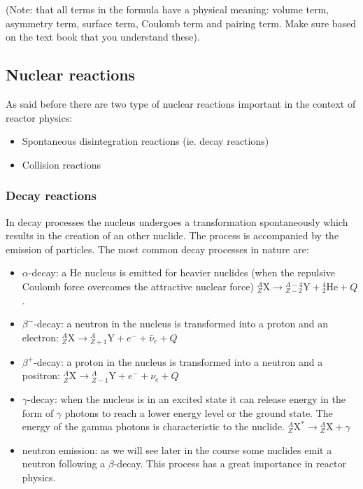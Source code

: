 (Note: that all terms in the formula have a physical meaning: volume term, asymmetry term, surface term, Coulomb term and pairing term. Make sure based on the text book that you understand these).


\subsection{Nuclear reactions}

As said before there are two type of nuclear reactions important in the context of reactor physics:

\begin{itemize}
\item Spontaneous disintegration reactions (ie. decay reactions)
\item Collision reactions
\end{itemize}

\subsubsection{Decay reactions}

In decay processes the nucleus undergoes a transformation spontaneously  which results in the creation of an other nuclide. The process is accompanied by the emission of particles. The most common decay processes in nature are:

\begin{itemize}
\item $\alpha$-decay: a He nucleus is emitted for heavier nuclides (when the repulsive Coulomb force overcomes the attractive nuclear force)  ${}_Z^A\text{X} \rightarrow {}_{Z-2}^{A-4}\text{Y} + {}_2^4\text{He} + Q$.
\item $\beta^-$-decay: a neutron in the nucleus is transformed into a proton and an electron: ${}_Z^A\text{X} \rightarrow {}_{Z+1}^{A}\text{Y} + e^-+\bar\nu_e + Q$
\item $\beta^+$-decay: a proton in the nucleus is transformed into a neutron and a positron: ${}_Z^A\text{X} \rightarrow {}_{Z-1}^{A}\text{Y} + e^-+\nu_e + Q$
\item $\gamma$-decay: when the nucleus is in an excited state it can release energy in the form of $\gamma$ photons to reach a lower energy level or the ground state. The energy of the gamma photons is characteristic to the nuclide. ${}_Z^A\text{X}^*\rightarrow {}_Z^A\text{X} + \gamma$
\item neutron emission: as we will see later in the course some nuclides emit a neutron following a $\beta$-decay. This process has a great importance in reactor physics.
\end{itemize}

